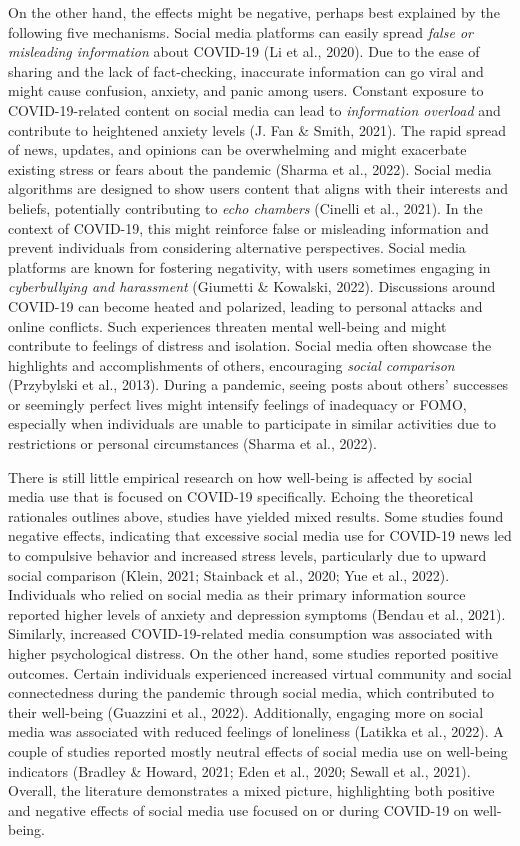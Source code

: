 \documentclass[
  man,mask,floatsintext]{apa7}
\begin{document}
On the other hand, the effects might be negative, perhaps best explained by the following five mechanisms.
Social media platforms can easily spread \emph{false or misleading information} about COVID-19 (Li et al., 2020).
Due to the ease of sharing and the lack of fact-checking, inaccurate information can go viral and might cause confusion, anxiety, and panic among users.
Constant exposure to COVID-19-related content on social media can lead to \emph{information overload} and contribute to heightened anxiety levels (J. Fan \& Smith, 2021).
The rapid spread of news, updates, and opinions can be overwhelming and might exacerbate existing stress or fears about the pandemic (Sharma et al., 2022).
Social media algorithms are designed to show users content that aligns with their interests and beliefs, potentially contributing to \emph{echo chambers} (Cinelli et al., 2021).
In the context of COVID-19, this might reinforce false or misleading information and prevent individuals from considering alternative perspectives.
Social media platforms are known for fostering negativity, with users sometimes engaging in \emph{cyberbullying and harassment} (Giumetti \& Kowalski, 2022).
Discussions around COVID-19 can become heated and polarized, leading to personal attacks and online conflicts.
Such experiences threaten mental well-being and might contribute to feelings of distress and isolation.
Social media often showcase the highlights and accomplishments of others, encouraging \emph{social comparison} (Przybylski et al., 2013).
During a pandemic, seeing posts about others' successes or seemingly perfect lives might intensify feelings of inadequacy or FOMO, especially when individuals are unable to participate in similar activities due to restrictions or personal circumstances (Sharma et al., 2022).

There is still little empirical research on how well-being is affected by social media use that is focused on COVID-19 specifically.
Echoing the theoretical rationales outlines above, studies have yielded mixed results.
Some studies found negative effects, indicating that excessive social media use for COVID-19 news led to compulsive behavior and increased stress levels, particularly due to upward social comparison (Klein, 2021; Stainback et al., 2020; Yue et al., 2022).
Individuals who relied on social media as their primary information source reported higher levels of anxiety and depression symptoms (Bendau et al., 2021).
Similarly, increased COVID-19-related media consumption was associated with higher psychological distress.
On the other hand, some studies reported positive outcomes.
Certain individuals experienced increased virtual community and social connectedness during the pandemic through social media, which contributed to their well-being (Guazzini et al., 2022).
Additionally, engaging more on social media was associated with reduced feelings of loneliness (Latikka et al., 2022).
A couple of studies reported mostly neutral effects of social media use on well-being indicators (Bradley \& Howard, 2021; Eden et al., 2020; Sewall et al., 2021).
Overall, the literature demonstrates a mixed picture, highlighting both positive and negative effects of social media use focused on or during COVID-19 on well-being.
\end{document}
